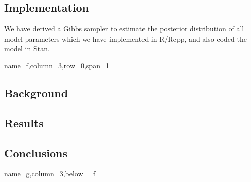 \documentclass[landscape,a0paper,fontscale=0.35]{baposter}
\begin{document}
\begin{poster}
{\subsection{Implementation}
We have derived a Gibbs sampler to estimate the posterior distribution of all model parameters which we have implemented in R/Rcpp, and also coded the model in Stan.

}

 {name=f,column=3,row=0,span=1}{
\subsection{Background}
\subsection{Results}
\subsection{Conclusions}
}


 {name=g,column=3,below = f}{




}

\end{poster}
\end{document}
